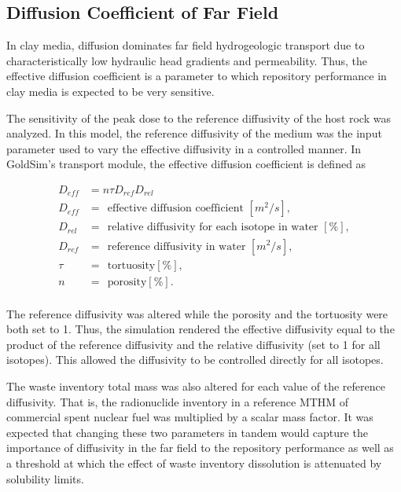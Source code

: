 
\subsection{Diffusion Coefficient of Far Field}
\label{sec:diffusivity}

In clay media, diffusion dominates far field hydrogeologic transport due to 
characteristically low hydraulic head gradients and permeability. Thus, the effective diffusion 
coefficient is a parameter to which repository performance in clay media is 
expected to be very sensitive. 

The sensitivity of the peak dose to the reference diffusivity of the 
host rock was analyzed.  In this model, the reference diffusivity of the medium 
was the input parameter used to vary the effective diffusivity in a controlled 
manner. In GoldSim's transport module, the effective diffusion coefficient is 
defined as 

\begin{align}\label{diffcoeff}
  D_{eff} &= n\tau D_{ref}D_{rel} \\ %
       D_{eff} &= ~~\mbox{effective diffusion coefficient }[m^2/s],\nonumber\\
       D_{rel} &= ~~\mbox{relative diffusivity for each isotope in water }[\%],\nonumber\\
       D_{ref} &= ~~\mbox{reference diffusivity in water }[m^2/s],\nonumber\\
       \tau &= ~~\mbox{tortuosity} [\%], \nonumber \\ 
       n &= ~~\mbox{porosity}[\%].\nonumber\\
  \label{GDSEdiff}
\end{align}

The reference diffusivity was altered while the porosity and the tortuosity 
were both set to 1. Thus, the simulation rendered the effective diffusivity 
equal to the product of the reference diffusivity and the relative diffusivity 
(set to 1 for all isotopes).  This allowed the diffusivity to be controlled 
directly for all isotopes.

The waste inventory total mass was also altered for each value of the reference 
diffusivity.  That is, the radionuclide inventory in a reference 
\gls{MTHM} of commercial spent nuclear fuel was multiplied by a scalar mass factor.  
It was expected that changing these two parameters in tandem would capture the 
importance of diffusivity in the far field to the repository performance 
as well as a threshold at which the effect of waste inventory dissolution is 
attenuated by solubility limits.


